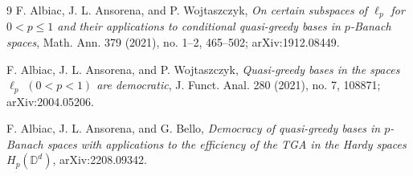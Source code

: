 \documentclass[11pt]{article}
\begin{document}
\begin{thebibliography}{9}
F. Albiac, J. L. Ansorena, and P. Wojtaszczyk,
\emph{On certain subspaces of \(\ell_p\) for \(0<p\le 1\) and their
applications to conditional quasi-greedy bases in \(p\)-Banach spaces},
Math. Ann. 379 (2021), no. 1--2, 465--502; arXiv:1912.08449.

F. Albiac, J. L. Ansorena, and P. Wojtaszczyk,
\emph{Quasi-greedy bases in the spaces \(\ell_p\) \((0<p<1)\) are democratic},
J. Funct. Anal. 280 (2021), no. 7, 108871; arXiv:2004.05206.

F. Albiac, J. L. Ansorena, and G. Bello,
\emph{Democracy of quasi-greedy bases in \(p\)-Banach spaces with applications
to the efficiency of the TGA in the Hardy spaces \(H_p(\mathbb D^d)\)},
arXiv:2208.09342.
\end{thebibliography}
\end{document}
